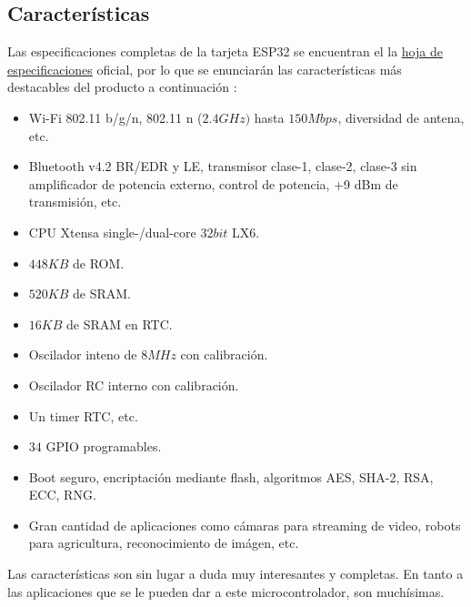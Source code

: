 \documentclass[conference]{IEEEtran}
\begin{document}
    \subsection{Características}

    Las especificaciones completas de la tarjeta ESP32 se encuentran el la
    \href{https://www.espressif.com/sites/default/files/documentation/esp32_datasheet_en.pdf}{hoja de especificaciones}
    oficial, por lo que se enunciarán las características más destacables del producto a continuación \cite{espressif-systems-shanghai-co-ltd-2022B}:

    \begin{itemize}
        \item Wi-Fi 802.11 b/g/n, 802.11 n ($2.4GHz)$ hasta $150Mbps$,
        diversidad de antena, etc.

        \item Bluetooth v4.2 BR/EDR y LE, transmisor clase-1, clase-2,
        clase-3 sin amplificador de potencia externo, control de potencia, +9
        dBm de transmisión, etc.

        \item CPU Xtensa single-/dual-core $32 bit$ LX6.

        \item $448 KB$ de ROM.

        \item $520 KB$ de SRAM.

        \item $16 KB$ de SRAM en RTC.

        \item Oscilador inteno de $8 MHz$ con calibración.

        \item Oscilador RC interno con calibración.

        \item Un timer RTC, etc.

        \item $34$ GPIO programables.

        \item Boot seguro, encriptación mediante flash, algoritmos AES,
        SHA-2, RSA, ECC, RNG.

        \item Gran cantidad de aplicaciones como cámaras para streaming de
        video, robots para agricultura, reconocimiento de imágen, etc.
    \end{itemize}

    Las características son sin lugar a duda muy interesantes y completas. En
    tanto a las aplicaciones que se le pueden dar a este microcontrolador,
    son muchísimas.
\end{document}
